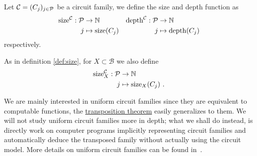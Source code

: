 \begin{definition}
  Let $\mathcal{C} = (C_j)_{j\in\mathcal{P}}$ be a circuit family, we
  define the size and
  depth function as
  \begin{align*}
    \operatorname{size}^{\mathcal{C}}:\mathcal{P}&\rightarrow\mathbb{N}  & \operatorname{depth}^{\mathcal{C}}:\mathcal{P}&\rightarrow\mathbb{N}\\
                   j&\mapsto\operatorname{size}(C_j) &    j&\mapsto\operatorname{depth}(C_j)
  \end{align*}
  respectively.

  As in definition \ref{def:size}, for $X\subset\mathcal{B}$ we also
  define
  \begin{align*}
    \operatorname{size}^{\mathcal{C}}_X:\mathcal{P}&\rightarrow\mathbb{N}\\
                     j&\mapsto\operatorname{size}_X(C_j)
                     \text{ .}
  \end{align*}
\end{definition}

We are mainly interested in uniform circuit families since they are
equivalent to computable functions, the
\hyperref[th:tellegen]{transposition theorem} easily generalizes to
them. We will not study uniform circuit families more in depth; what
we shall do instead, is directly work on computer programs implicitly
representing circuit families and automatically deduce the transposed
family without actually using the circuit model. More details on
uniform circuit families can be found in~\cite{vollmer}.


%
